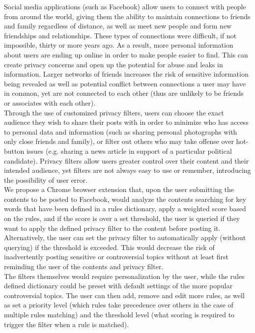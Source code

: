 \tab Social media applications (such as Facebook) allow users to connect with people from around the world, giving them the ability to maintain connections to friends and family regardless of distance, as well as meet new people and form new friendships and relationships. These types of connections were difficult, if not impossible, thirty or more years ago. As a result, more personal information about users are ending up online in order to make people easier to find. This can create privacy concerns and open up the potential for abuse and leaks in information. Larger networks of friends increases the risk of sensitive information being revealed as well as potential conflict between connections a user may have in common, yet are not connected to each other (thus are unlikely to be friends or associates with each other). 
\\
\tab Through the use of customized privacy filters, users can choose the exact audience they wish to share their posts with in order to minimize who has access to personal data and information (such as sharing personal photographs with only close friends and family), or filter out others who may take offense over hot-button issues (e.g. sharing a news article in support of a particular political candidate). Privacy filters allow users greater control over their content and their intended audience, yet filters are not always easy to use or remember, introducing the possibility of user error.\cite{naini2015analyzing}
\\
\tab We propose a Chrome browser extension that, upon the user submitting the contents to be posted to Facebook, would analyze the contents searching for key words that have been defined in a rules dictionary, apply a weighted score based on the rules, and if the score is over a set threshold, the user is queried if they want to apply the defined privacy filter to the content before posting it. Alternatively, the user can set the privacy filter to automatically apply (without querying) if the threshold is exceeded. This would decrease the risk of inadvertently posting sensitive or controversial topics without at least first reminding the user of the contents and privacy filter.
\\
\tab The filters themselves would require personalization by the user, while the rules defined dictionary could be preset with default settings of the more popular controversial topics. The user can then add, remove and edit more rules, as well as set a priority level (which rules take precedence over others in the case of multiple rules matching) and the threshold level (what scoring is required to trigger the filter when a rule is matched).
